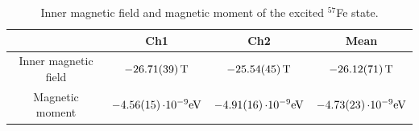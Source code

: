 \begin{table}
    \centering
    \caption{Inner magnetic field and magnetic moment of the excited $^{57}$Fe state.}

    \begin{tabular}{c c c c}
     \toprule
     &Ch1&Ch2&Mean \\
     \hline
     Inner magnetic field &  $-\SI{26.71\pm 0.39}{T}$ &$-\SI{25.54\pm 0.45}{T}$   &$-\SI{26.12\pm 0.71}{T}$ \\
     Magnetic moment& $-\SI{4.56\pm 0.15}{\cdot 10^{-9}eV}$  &$-\SI{4.91\pm 0.16}{\cdot 10^{-9}eV}$   &$-\SI{4.73\pm 0.23}{\cdot 10^{-9}eV}$\\
     \bottomrule
    \end{tabular}

    \label{tab:fe2}
\end{table}

